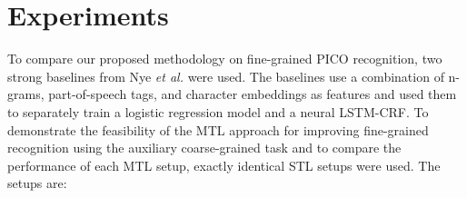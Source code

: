 \documentclass[runningheads]{llncs}
\begin{document}
\section{Experiments}
\label{sec:experiments}
%
To compare our proposed methodology on fine-grained PICO recognition, two strong baselines from Nye \textit{et al.} were used.
The baselines use a combination of n-grams, part-of-speech tags, and character embeddings as features and used them to separately train a logistic regression model and a neural LSTM-CRF.
To demonstrate the feasibility of the MTL approach for improving fine-grained recognition using the auxiliary coarse-grained task and to compare the performance of each MTL setup, exactly identical STL setups were used.
The setups are: 

%
\end{document}
